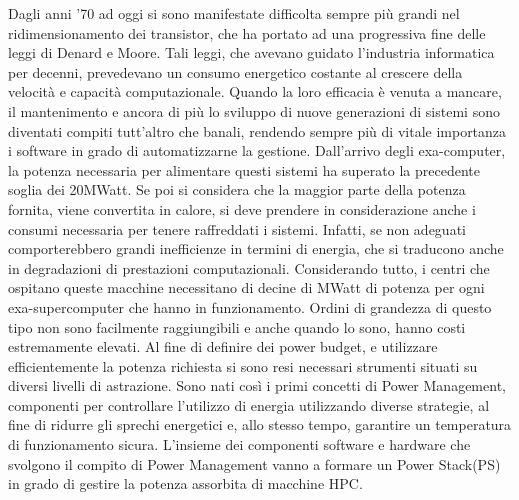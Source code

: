 Dagli anni '70 ad oggi si sono manifestate difficolta sempre più grandi nel ridimensionamento dei transistor, che ha portato ad una progressiva fine delle leggi di Denard e Moore\cite{Dennardsscaling}\cite{Dennardsscaling2}. Tali leggi, che avevano guidato l'industria informatica per decenni, prevedevano un consumo energetico costante al crescere della velocità e capacità computazionale. Quando la loro efficacia è venuta a mancare, il mantenimento e ancora di più lo sviluppo di nuove generazioni di sistemi sono diventati compiti tutt'altro che banali, rendendo sempre più di vitale importanza i software in grado di automatizzarne la gestione.
Dall'arrivo degli exa-computer, la potenza necessaria per alimentare questi sistemi ha superato la precedente soglia dei 20MWatt\cite{TOP500}. Se poi si considera che la maggior parte della potenza fornita, viene convertita in calore, si deve prendere in considerazione anche i consumi necessaria per tenere raffreddati i sistemi. Infatti, se non adeguati comporterebbero grandi inefficienze in termini di energia, che si traducono anche in degradazioni di prestazioni computazionali. Considerando tutto, i centri che ospitano queste macchine necessitano di decine di MWatt di potenza per ogni exa-supercomputer che hanno in funzionamento. Ordini di grandezza di questo tipo non sono facilmente raggiungibili e anche quando lo sono, hanno costi estremamente elevati. 
Al fine di definire dei power budget, e utilizzare efficientemente la potenza richiesta si sono resi necessari strumenti situati su diversi livelli di astrazione. 
Sono nati così i primi concetti di Power Management, componenti per controllare l'utilizzo di energia utilizzando diverse strategie, al fine di ridurre gli sprechi energetici e, allo stesso tempo, garantire un temperatura di funzionamento sicura.%
L'insieme dei componenti software e hardware che svolgono il compito di Power Management vanno a formare un Power Stack(PS) in grado di gestire la potenza assorbita di macchine HPC.



